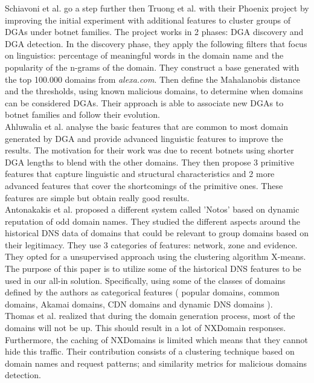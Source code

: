 Schiavoni et al. \cite{phoenix} go a step further then Truong et al. with their Phoenix project by improving the initial experiment with additional features to cluster groups of DGAs under botnet families. The project works in 2 phases: DGA discovery and DGA detection. In the discovery phase, they apply the following filters that focus on linguistics: percentage of meaningful words in the domain name and the popularity of the n-grams of the domain. They construct a base generated with the top 100.000 domains from \textit{alexa.com}. Then define the Mahalanobis distance and the thresholds, using known malicious domains,  to determine when domains can be considered DGAs. Their approach is able to associate new DGAs to botnet families and follow their evolution.\\

Ahluwalia et al. \cite{dga} analyse the basic features that are common to most domain generated by DGA and provide advanced linguistic features to improve the results. The motivation for their work was due to recent botnets using shorter DGA lengths to blend with the other domains. They then propose 3 primitive features that capture linguistic and structural characteristics and 2 more advanced features that cover the shortcomings of the primitive ones. These features are simple but obtain really good results.\\

Antonakakis et al. \cite{dnsreputation} proposed a different system called 'Notos' based on dynamic reputation of odd domain names. They studied the different aspects around the historical DNS data of domains that could be relevant to group domains based on their legitimacy. They use 3 categories of features: network, zone and evidence. They opted for a unsupervised approach using the clustering algorithm X-means. The purpose of this paper is to utilize some of the historical DNS features to be used in our all-in solution. Specifically, using some of the classes of domains defined by the authors as categorical features ( popular domains, common domains, Akamai domains,  CDN domains and dynamic DNS domains ).\\

Thomas et al. \cite{dga4} realized that during the domain generation process, most of the domains will not be up. This should result in a lot of NXDomain responses. Furthermore, the caching of NXDomains is limited which means that they cannot hide this traffic. Their contribution consists of a clustering technique based on domain names and request patterns; and similarity metrics for malicious domains detection.\\

